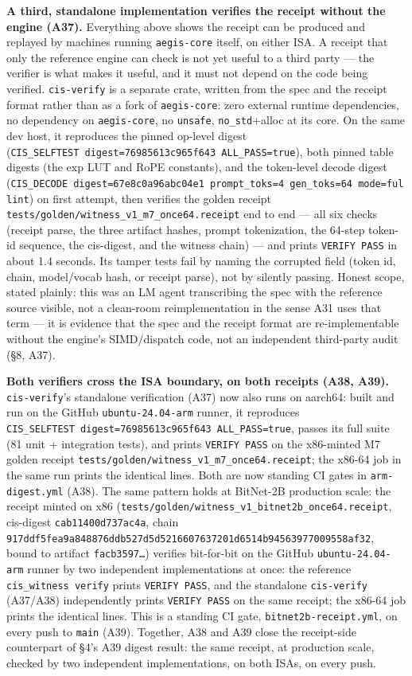 \documentclass[11pt]{article}
\begin{document}
\textbf{A third, standalone implementation verifies the receipt without the engine (A37).} Everything
above shows the receipt can be produced and replayed by machines running \texttt{aegis-core} itself, on
either ISA. A receipt that only the reference engine can check is not yet useful to a third party
--- the verifier is what makes it useful, and it must not depend on the code being verified.
\texttt{cis-verify} is a separate crate, written from the spec and the receipt format rather than as a
fork of \texttt{aegis-core}: zero external runtime dependencies, no dependency on \texttt{aegis-core}, no
\texttt{unsafe}, \texttt{no\_std}+alloc at its core. On the same dev host, it reproduces the pinned op-level
digest (\texttt{CIS\_SELFTEST\ digest=76985613c965f643\ ALL\_PASS=true}), both pinned table digests (the exp
LUT and RoPE constants), and the token-level decode digest
(\texttt{CIS\_DECODE\ digest=67e8c0a96abc04e1\ prompt\_toks=4\ gen\_toks=64\ mode=fullint}) on first attempt,
then verifies the golden receipt \texttt{tests/golden/witness\_v1\_m7\_once64.receipt} end to end --- all six
checks (receipt parse, the three artifact hashes, prompt tokenization, the 64-step token-id
sequence, the cis-digest, and the witness chain) --- and prints \texttt{VERIFY\ PASS} in about 1.4 seconds.
Its tamper tests fail by naming the corrupted field (token id, chain, model/vocab hash, or
receipt parse), not by silently passing. Honest scope, stated plainly: this was an LM agent
transcribing the spec with the reference source visible, not a clean-room reimplementation in the
sense A31 uses that term --- it is evidence that the spec and the receipt format are re-implementable
without the engine's SIMD/dispatch code, not an independent third-party audit (§8, A37).

\textbf{Both verifiers cross the ISA boundary, on both receipts (A38, A39).} \texttt{cis-verify}'s standalone
verification (A37) now also runs on aarch64: built and run on the GitHub \texttt{ubuntu-24.04-arm}
runner, it reproduces \texttt{CIS\_SELFTEST\ digest=76985613c965f643\ ALL\_PASS=true}, passes its full suite
(81 unit + integration tests), and prints \texttt{VERIFY\ PASS} on the x86-minted M7 golden receipt
\texttt{tests/golden/witness\_v1\_m7\_once64.receipt}; the x86-64 job in the same run prints the identical
lines. Both are now standing CI gates in \texttt{arm-digest.yml} (A38). The same pattern holds at
BitNet-2B production scale: the receipt minted on x86 (\texttt{tests/golden/witness\_v1\_bitnet2b\_once64.receipt},
cis-digest \texttt{cab11400d737ac4a}, chain
\texttt{917ddf5fea9a848876ddb527d5d5216607637201d6514b94563977009558af32}, bound to artifact
\texttt{facb3597…}) verifies bit-for-bit on the GitHub \texttt{ubuntu-24.04-arm} runner by two independent
implementations at once: the reference \texttt{cis\_witness\ verify} prints \texttt{VERIFY\ PASS}, and the
standalone \texttt{cis-verify} (A37/A38) independently prints \texttt{VERIFY\ PASS} on the same receipt; the
x86-64 job prints the identical lines. This is a standing CI gate, \texttt{bitnet2b-receipt.yml}, on
every push to \texttt{main} (A39). Together, A38 and A39 close the receipt-side counterpart of §4's A39
digest result: the same receipt, at production scale, checked by two independent implementations,
on both ISAs, on every push.
\end{document}
